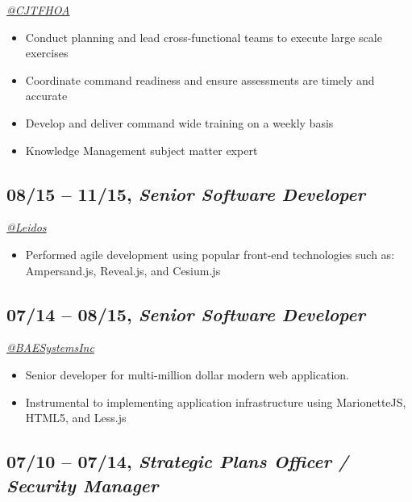 \documentclass[10pt]{article}
\def\tightlist{}
\begin{document}
\emph{\href{https://twitter.com/CJTFHOA}{@CJTFHOA}}

\begin{itemize}
\tightlist
\item
  Conduct planning and lead cross-functional teams to execute large
  scale exercises
\item
  Coordinate command readiness and ensure assessments are timely and
  accurate
\item
  Develop and deliver command wide training on a weekly basis
\item
  Knowledge Management subject matter expert
\end{itemize}

\hypertarget{senior-software-developer}{%
\subsection{\texorpdfstring{08/15 -- 11/15, \textbf{\emph{Senior
Software
Developer}}}{08/15 -- 11/15, Senior Software Developer}}\label{senior-software-developer}}

\emph{\href{https://twitter.com/LeidosInc}{@Leidos}}

\begin{itemize}
\tightlist
\item
  Performed agile development using popular front-end technologies such
  as: Ampersand.js, Reveal.js, and Cesium.js
\end{itemize}

\hypertarget{senior-software-developer-1}{%
\subsection{\texorpdfstring{07/14 -- 08/15, \textbf{\emph{Senior
Software
Developer}}}{07/14 -- 08/15, Senior Software Developer}}\label{senior-software-developer-1}}

\emph{\href{https://twitter.com/BAESystemsInc}{@BAESystemsInc}}

\begin{itemize}
\tightlist
\item
  Senior developer for multi-million dollar modern web application.
\item
  Instrumental to implementing application infrastructure using
  MarionetteJS, HTML5, and Less.js
\end{itemize}

\hypertarget{strategic-plans-officer-security-manager}{%
\subsection{\texorpdfstring{07/10 -- 07/14, \textbf{\emph{Strategic
Plans Officer / Security
Manager}}}{07/10 -- 07/14, Strategic Plans Officer / Security Manager}}\label{strategic-plans-officer-security-manager}}
\end{document}
